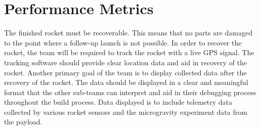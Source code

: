 \documentclass[10pt, letterpaper, twoside, onecolumn]{article}
\begin{document}
\section{Performance Metrics}

The finished rocket must be recoverable. This means that no parts are damaged to the point where a follow-up launch is not possible. In order to recover the rocket, the team will be required to track the rocket with a live GPS signal. The tracking software should provide clear location data and aid in recovery of the rocket.
Another primary goal of the team is to display collected data after the recovery of the rocket. The data should be displayed in a clear and meaningful format that the other sub-teams can interpret and aid in their debugging process throughout the build process. Data displayed is to include telemetry data collected by various rocket sensors and the microgravity experiment data from the payload.
\end{document}
